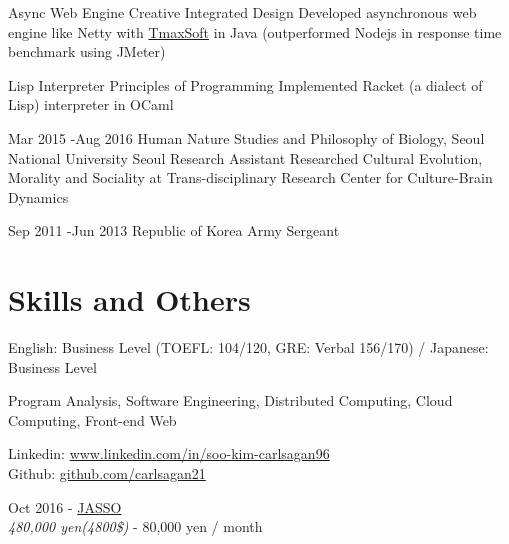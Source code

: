 \documentclass[10pt]{article} %
\begin{document}


\project
{}
{Async Web Engine}
{Creative Integrated Design}
{Developed asynchronous web engine like Netty with \href{https://kr.tmaxsoft.com/main.do}{TmaxSoft} in Java (outperformed Nodejs in response time benchmark using JMeter)}

\project
{}
{Lisp Interpreter}
{Principles of Programming}
{Implemented Racket (a dialect of Lisp) interpreter in OCaml}

\if{}
\job
{Mar 2015 -}{Aug 2016}
{Human Nature Studies and Philosophy of Biology, Seoul National University}
{Seoul}
{}
{Research Assistant}
{Researched Cultural Evolution, Morality and Sociality at Trans-disciplinary Research Center for Culture-Brain Dynamics}
\fi


\if{}
\job
{Sep 2011 -}{Jun 2013}
{Republic of Korea Army}
{}
{}
{Sergeant}
\fi


\section{Skills and Others}

{
English: Business Level (TOEFL: 104/120, GRE: Verbal 156/170) / Japanese: Business Level
}

{
Program Analysis, Software Engineering, Distributed Computing, Cloud Computing, Front-end Web
}

{
Linkedin: \href{https://www.linkedin.com/in/soo-kim-carlsagan96}{www.linkedin.com/in/soo-kim-carlsagan96}\\
Github: \href{https://github.com/carlsagan21}{github.com/carlsagan21}
}

\if{}
{
Oct 2016 - \href{http://www.jasso.go.jp/ryugaku/tantosha/study_a/short_term_h/index.html}{JASSO}\\
\textit{480,000 yen(4800\$)} - 80,000 yen / month\\
}
\end{document}
